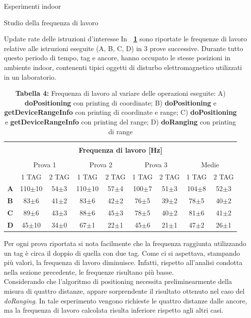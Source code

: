 \documentclass[12pt]{report}
\begin{document}
\begin{section}{Esperimenti indoor}
\begin{subsection}{Studio della frequenza di lavoro}
\begin{subsubsection}{Update rate delle istruzioni d'interesse}
			In \textbf{\tablename~\ref{Tfreqop}} sono riportate le frequenze di lavoro relative alle istruzioni eseguite (A, B, C, D) in 3 prove successive. Durante tutto questo periodo di tempo, tag e ancore, hanno occupato le stesse posizioni in ambiente indoor, contenenti tipici oggetti di disturbo elettromagnetico utilizzati 			in un laboratorio. 

			\begin{table}[h]
				\centering
				\begin{tabular}{|l|c|c|c|c|c|c|c|c|}
					\hline
					\multicolumn{9}{|c|}{}\\
					\multicolumn{9}{|c|}{\textbf{\Large Frequenza di lavoro [Hz]}}\\
					\multicolumn{9}{|c|}{}\\
					\hline
					\multirow{2}{*}{}&		\multicolumn{2}{|c|}{Prova 1}&					\multicolumn{2}{|c|}{Prova 2}&					\multicolumn{2}{|c|}{Prova 3}&				\multicolumn{2}{|c|}{Medie}\\
					\cline{2-9}
					 &									1 TAG&					2 TAG&								1 TAG&					2 TAG&								1 TAG&					2 TAG&							1 TAG&					2 TAG\\
					\hline
					{\textbf{A}}&				110$\pm$10&		54$\pm$3&						110$\pm$10&		57$\pm$4&						100$\pm$7&			51$\pm$3& 					104$\pm$8&			52$\pm$3\\	
					\hline	
					{\textbf{B}}&	 			83$\pm$6&			41$\pm$2&						83$\pm$6&			42$\pm$2& 						76$\pm$5&			39$\pm$2&					78$\pm$5	&			40$\pm$2\\	
					\hline	
					{\textbf{C}}&	 			89$\pm$6&			43$\pm$3&						88$\pm$6&			45$\pm$3& 						78$\pm$5&			40$\pm$2& 					81$\pm$6&			41$\pm$2\\	
					\hline	
					{\textbf{D}}&				45$\pm$10&			34$\pm$0&						67$\pm$1&			22$\pm$1& 						45$\pm$6&			21$\pm$1& 					47$\pm$2&			26$\pm$1\\	
					\hline				
				\end{tabular}
				\caption{\textbf{Tabella 4: } Frequenza di lavoro al variare delle operazioni eseguite: A) \textbf{doPositioning} con printing di coordinate; B) \textbf{doPositioning} e \textbf{getDeviceRangeInfo} con printing di coordinate e range; C) \textbf{doPositioning} e \textbf{getDeviceRangeInfo} con printing del 																		range; D) \textbf{doRanging} con printing di range\label{Tfreqop}}
			\end{table}
			Per ogni prova riportata si nota facilmente che la frequenza raggiunta utilizzando un tag è circa il doppio di quella con due tag. Come ci si aspettava, stampando più valori, la frequenza di lavoro diminuisce. Infatti, rispetto all’analisi condotta nella sezione precedente, le frequenze risultano più basse.\\
			Considerando che l'algoritmo di positioning necessita preliminearmente della misura di quattro distanze, appare sorprendente il risultato ottenuto nel caso del \textit{doRanging}. In tale esperimento vengono richieste le quattro distanze dalle ancore, ma la frequenza di lavoro calcolata risulta inferiore rispetto 					agli altri casi.


\end{subsubsection}
\end{subsection}
\end{section}
\end{document}
